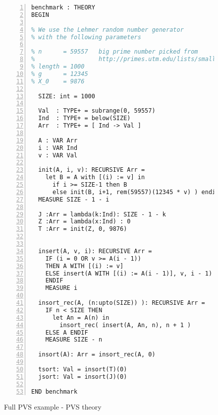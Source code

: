 \documentclass[12pt,a4paper]{article}
\begin{document}
\newpage
\begin{figure}
\begin{lstlisting}[numbers=left,language=TeX]
benchmark : THEORY
BEGIN

% We use the Lehmer random number generator
% with the following parameters

% n      = 59557   big prime number picked from
%                  http://primes.utm.edu/lists/small/10000.txt
% length = 1000
% g      = 12345
% X_0    = 9876

  SIZE: int = 1000
  
  Val  : TYPE+ = subrange(0, 59557)
  Ind  : TYPE+ = below(SIZE)
  Arr  : TYPE+ = [ Ind -> Val ]
  
  A : VAR Arr
  i : VAR Ind
  v : VAR Val
  
  init(A, i, v): RECURSIVE Arr =
    let B = A with [(i) := v] in
      if i >= SIZE-1 then B	
      else init(B, i+1, rem(59557)(12345 * v) ) endif
  MEASURE SIZE - 1 - i
  
  J :Arr = lambda(k:Ind): SIZE - 1 - k
  Z :Arr = lambda(x:Ind) : 0
  T :Arr = init(Z, 0, 9876)
  
  
  insert(A, v, i): RECURSIVE Arr =
    IF (i = 0 OR v >= A(i - 1))
    THEN A WITH [(i) := v]
    ELSE insert(A WITH [(i) := A(i - 1)], v, i - 1)
    ENDIF
    MEASURE i

  insort_rec(A, (n:upto(SIZE)) ): RECURSIVE Arr =
    IF n < SIZE THEN
      let An = A(n) in
        insort_rec( insert(A, An, n), n + 1 )
    ELSE A ENDIF
    MEASURE SIZE - n

  insort(A): Arr = insort_rec(A, 0)
  
  tsort: Val = insort(T)(0)
  jsort: Val = insort(J)(0)
  
END benchmark
\end{lstlisting}
\caption{Full PVS example - PVS theory}
\label{fig:PVSbenchmark}
\end{figure}
\end{document}
